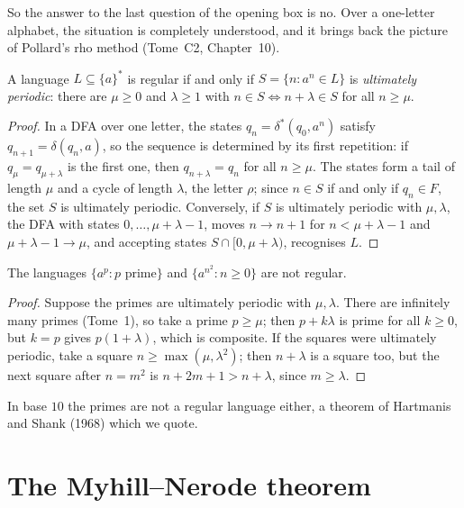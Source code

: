 So the answer to the last question of the opening box is no. Over a one-letter alphabet, the situation is completely understood, and it brings back the picture of Pollard's rho method (Tome~C2, Chapter~10).

\begin{proposition}\label{prop:unary}
A language $L\subseteq\{a\}^*$ is regular if and only if $S=\{n:a^n\in L\}$ is \emph{ultimately periodic}: there are $\mu\ge0$ and $\lambda\ge1$ with $n\in S\iff n+\lambda\in S$ for all $n\ge\mu$.
\end{proposition}

\begin{proof}
In a DFA over one letter, the states $q_n=\delta^*(q_0,a^n)$ satisfy $q_{n+1}=\delta(q_n,a)$, so the sequence is determined by its first repetition: if $q_\mu=q_{\mu+\lambda}$ is the first one, then $q_{n+\lambda}=q_n$ for all $n\ge\mu$. The states form a tail of length $\mu$ and a cycle of length $\lambda$, the letter $\rho$; since $n\in S$ if and only if $q_n\in F$, the set $S$ is ultimately periodic. Conversely, if $S$ is ultimately periodic with $\mu,\lambda$, the DFA with states $0,\dots,\mu+\lambda-1$, moves $n\to n+1$ for $n<\mu+\lambda-1$ and $\mu+\lambda-1\to\mu$, and accepting states $S\cap[0,\mu+\lambda)$, recognises $L$.
\end{proof}

\begin{corollary}\label{cor:primes}
The languages $\{a^p:p\text{ prime}\}$ and $\{a^{n^2}:n\ge0\}$ are not regular.
\end{corollary}

\begin{proof}
Suppose the primes are ultimately periodic with $\mu,\lambda$. There are infinitely many primes (Tome~1), so take a prime $p\ge\mu$; then $p+k\lambda$ is prime for all $k\ge0$, but $k=p$ gives $p(1+\lambda)$, which is composite. If the squares were ultimately periodic, take a square $n\ge\max(\mu,\lambda^2)$; then $n+\lambda$ is a square too, but the next square after $n=m^2$ is $n+2m+1>n+\lambda$, since $m\ge\lambda$.
\end{proof}

\begin{remark}
In base $10$ the primes are not a regular language either, a theorem of Hartmanis and Shank (1968) which we quote.
\end{remark}

\section{The Myhill--Nerode theorem}\label{sec:myhill}

